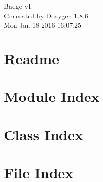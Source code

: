 \documentclass[twoside]{book}
\newcommand{\clearemptydoublepage}{%
  \newpage{\pagestyle{empty}\cleardoublepage}%
}
\begin{document}
\hypersetup{pageanchor=false}
\begin{titlepage}
\vspace*{7cm}
\begin{center}%
{\Large Badge v1 }\\
\vspace*{1cm}
{\large Generated by Doxygen 1.8.6}\\
\vspace*{0.5cm}
{\small Mon Jan 18 2016 16:07:25}\\
\end{center}
\end{titlepage}
\clearemptydoublepage
\tableofcontents
\clearemptydoublepage
{}
\hypersetup{pageanchor=true}

\chapter{Readme}
\label{md_Readme}
\hypertarget{md_Readme}{}

\chapter{Module Index}

\chapter{Class Index}

\chapter{File Index}

\end{document}
